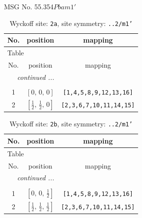 \documentclass[fleqn,8pt]{jsarticle}
\begin{document}
\setcounter{MaxMatrixCols}{32}

\renewcommand{\tablename}{Table~}
\renewcommand{\figurename}{Figure~}
\begin{center}
\LARGE
MSG No. 55.354\quad$Pbam1'$
\end{center}
\renewcommand{\arraystretch}{1.2}
\begin{longtable}{ccc}
\caption{Wyckoff site: {\tt 2a}, site symmetry: {\tt ..2/m1'}}
 \\
 \hline \hline
No. & position & mapping \\ \hline \endfirsthead

\multicolumn{2}{l}{\tablename\ \thetable{}} \\
 \hline \hline
No. & position & mapping \\ \hline \endhead

 \hline \hline
\multicolumn{2}{r}{\footnotesize\it continued ...} \\ \endfoot

 \hline \hline
\multicolumn{2}{r}{} \\ \endlastfoot

1 & $\left[ 0,\, 0,\, 0 \right]$ & {\tt [1,4,5,8,9,12,13,16]} \\ \hline
2 & $\left[ \frac{1}{2},\, \frac{1}{2},\, 0 \right]$ & {\tt [2,3,6,7,10,11,14,15]} \\
\end{longtable}
\renewcommand{\arraystretch}{1.2}
\begin{longtable}{ccc}
\caption{Wyckoff site: {\tt 2b}, site symmetry: {\tt ..2/m1'}}
 \\
 \hline \hline
No. & position & mapping \\ \hline \endfirsthead

\multicolumn{2}{l}{\tablename\ \thetable{}} \\
 \hline \hline
No. & position & mapping \\ \hline \endhead

 \hline \hline
\multicolumn{2}{r}{\footnotesize\it continued ...} \\ \endfoot

 \hline \hline
\multicolumn{2}{r}{} \\ \endlastfoot

1 & $\left[ 0,\, 0,\, \frac{1}{2} \right]$ & {\tt [1,4,5,8,9,12,13,16]} \\ \hline
2 & $\left[ \frac{1}{2},\, \frac{1}{2},\, \frac{1}{2} \right]$ & {\tt [2,3,6,7,10,11,14,15]} \\
\end{longtable}
\end{document}
